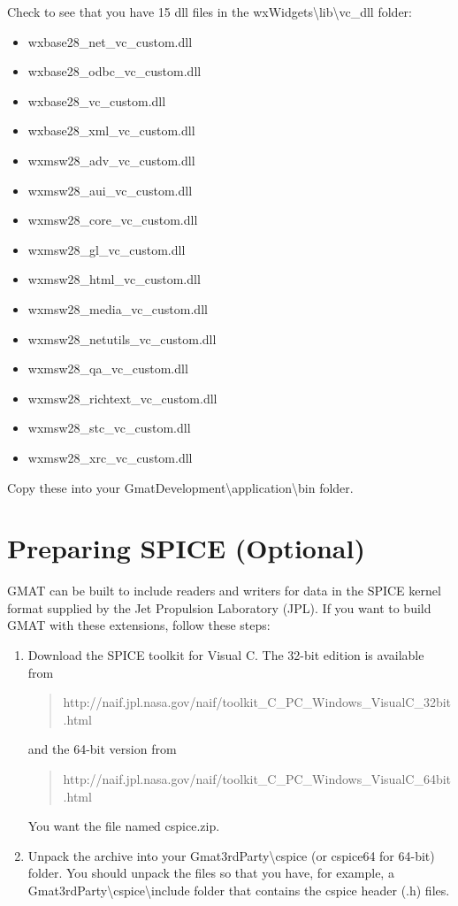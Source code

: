 \documentclass[letterpaper,10pt]{article}%
\begin{document}
\noindent Check to see that you have 15 dll files in the wxWidgets\textbackslash lib\textbackslash vc\_dll folder:
{\begin{itemize}\setlength{\itemsep}{0pt}
\item wxbase28\_net\_vc\_custom.dll
\item wxbase28\_odbc\_vc\_custom.dll
\item wxbase28\_vc\_custom.dll
\item wxbase28\_xml\_vc\_custom.dll
\item wxmsw28\_adv\_vc\_custom.dll
\item wxmsw28\_aui\_vc\_custom.dll
\item wxmsw28\_core\_vc\_custom.dll
\item wxmsw28\_gl\_vc\_custom.dll
\item wxmsw28\_html\_vc\_custom.dll
\item wxmsw28\_media\_vc\_custom.dll
\item wxmsw28\_netutils\_vc\_custom.dll
\item wxmsw28\_qa\_vc\_custom.dll
\item wxmsw28\_richtext\_vc\_custom.dll
\item wxmsw28\_stc\_vc\_custom.dll
\item wxmsw28\_xrc\_vc\_custom.dll
\end{itemize}}
  
\noindent Copy these into your GmatDevelopment\textbackslash application\textbackslash bin folder.

\section{Preparing SPICE (Optional)}

GMAT can be built to include readers and writers for data in the SPICE kernel format supplied by the Jet Propulsion Laboratory (JPL).  If you want to build GMAT with these extensions, follow these steps:

\begin{enumerate}
\item Download the SPICE toolkit for Visual C.  The 32-bit edition is available from
\begin{quote}
http://naif.jpl.nasa.gov/naif/toolkit\_C\_PC\_Windows\_VisualC\_32bit.html
\end{quote}
\noindent and the 64-bit version from
\begin{quote}
http://naif.jpl.nasa.gov/naif/toolkit\_C\_PC\_Windows\_VisualC\_64bit.html
\end{quote}
\noindent You want the file named cspice.zip.
\item Unpack the archive into your Gmat3rdParty\textbackslash cspice (or cspice64 for 64-bit) folder.  You should unpack the files so that you have, for example, a Gmat3rdParty\textbackslash cspice\textbackslash include folder that contains the cspice header (.h) files.  
\end{enumerate}
\end{document}
